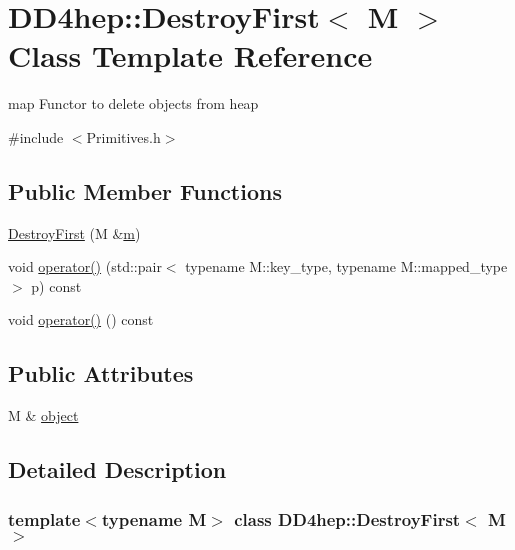 \hypertarget{class_d_d4hep_1_1_destroy_first}{}\section{D\+D4hep\+:\+:Destroy\+First$<$ M $>$ Class Template Reference}
\label{class_d_d4hep_1_1_destroy_first}


map Functor to delete objects from heap  




{\ttfamily \#include $<$Primitives.\+h$>$}

\subsection*{Public Member Functions}
\begin{DoxyCompactItemize}
\item 
\hyperlink{class_d_d4hep_1_1_destroy_first_a2ab7069ab1062311f4ad6e7c5e93d340}{Destroy\+First} (M \&\hyperlink{_volumes_8cpp_a6fc379aaec47ce424b00d8ffda2a6c59}{m})
\item 
void \hyperlink{class_d_d4hep_1_1_destroy_first_a77c70c358c4ff98adb3dd9f3eeb8cbdd}{operator()} (std\+::pair$<$ typename M\+::key\+\_\+type, typename M\+::mapped\+\_\+type $>$ p) const
\item 
void \hyperlink{class_d_d4hep_1_1_destroy_first_af5aaa086b4ebf2d3c7d50cfc7ab6bde4}{operator()} () const
\end{DoxyCompactItemize}
\subsection*{Public Attributes}
\begin{DoxyCompactItemize}
\item 
M \& \hyperlink{class_d_d4hep_1_1_destroy_first_a18b46ba57a4b4115bbfd3774f8632ea1}{object}
\end{DoxyCompactItemize}


\subsection{Detailed Description}
\subsubsection*{template$<$typename M$>$\newline
class D\+D4hep\+::\+Destroy\+First$<$ M $>$}

